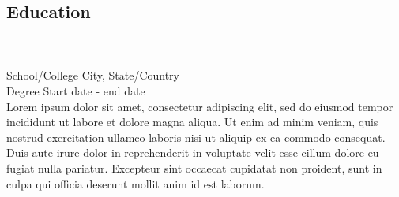 \documentclass{resume_template}
\begin{document}
\begin{tcolorbox}[colframe=white,colback=white,arc=0mm]
\begin{minipage}[t]{5.25in}
\begin{tcolorbox}[colframe=white,colback=white,arc=0mm,height=8.405in]
			\section*{Education}
			\vspace*{-0.2in}
			\hrulefill\\\\
			School/College \hfill City, State/Country \\
			Degree \hfill Start date - end date \\
			Lorem ipsum dolor sit amet, consectetur adipiscing elit, sed do eiusmod tempor incididunt ut labore et dolore magna aliqua. Ut enim ad minim veniam, quis nostrud exercitation ullamco laboris nisi ut aliquip ex ea commodo consequat. Duis aute irure dolor in reprehenderit in voluptate velit esse cillum dolore eu fugiat nulla pariatur. Excepteur sint occaecat cupidatat non proident, sunt in culpa qui officia deserunt mollit anim id est laborum.\\\\
		\end{tcolorbox}
	\end{minipage}
\end{tcolorbox}
\end{document}
